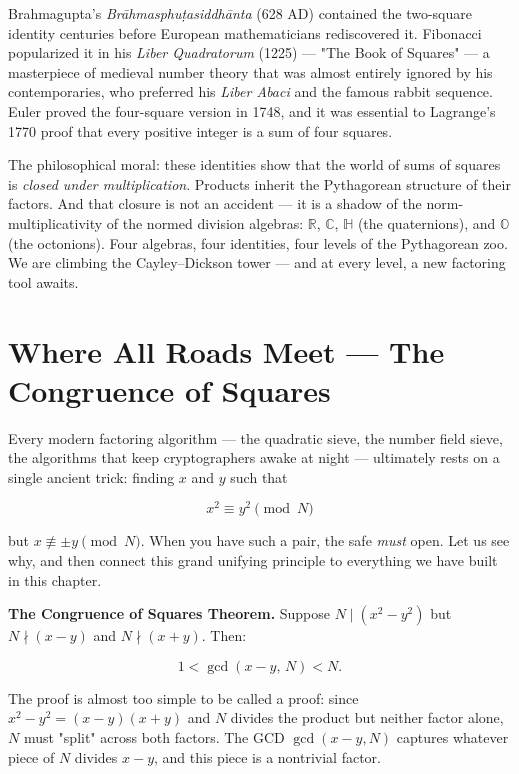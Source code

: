 \documentclass[11pt,openright,twoside]{book}
\theoremstyle{definition}
\begin{document}
Brahmagupta's \textit{Brāhmasphuṭasiddhānta} (628 AD) contained the two-square identity centuries before European mathematicians rediscovered it. Fibonacci popularized it in his \textit{Liber Quadratorum} (1225) --- "The Book of Squares" --- a masterpiece of medieval number theory that was almost entirely ignored by his contemporaries, who preferred his \textit{Liber Abaci} and the famous rabbit sequence. Euler proved the four-square version in 1748, and it was essential to Lagrange's 1770 proof that every positive integer is a sum of four squares.

The philosophical moral: these identities show that the world of sums of squares is \textit{closed under multiplication}. Products inherit the Pythagorean structure of their factors. And that closure is not an accident --- it is a shadow of the norm-multiplicativity of the normed division algebras: $\mathbb{R}$, $\mathbb{C}$, $\mathbb{H}$ (the quaternions), and $\mathbb{O}$ (the octonions). Four algebras, four identities, four levels of the Pythagorean zoo. We are climbing the Cayley--Dickson tower --- and at every level, a new factoring tool awaits.


\bigskip


\section{Where All Roads Meet — The Congruence of Squares}

Every modern factoring algorithm --- the quadratic sieve, the number field sieve, the algorithms that keep cryptographers awake at night --- ultimately rests on a single ancient trick: finding $x$ and $y$ such that

\[x^2 \equiv y^2 \pmod{N}\]

but $x \not\equiv \pm y \pmod{N}$. When you have such a pair, the safe \textit{must} open. Let us see why, and then connect this grand unifying principle to everything we have built in this chapter.

\textbf{The Congruence of Squares Theorem.} Suppose $N \mid (x^2 - y^2)$ but $N \nmid (x - y)$ and $N \nmid (x + y)$. Then:

\[1 < \gcd(x - y, \, N) < N.\]

The proof is almost too simple to be called a proof: since $x^2 - y^2 = (x - y)(x + y)$ and $N$ divides the product but neither factor alone, $N$ must "split" across both factors. The GCD $\gcd(x - y, N)$ captures whatever piece of $N$ divides $x - y$, and this piece is a nontrivial factor.
\end{document}
